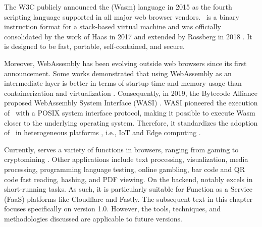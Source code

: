 \msection{\Wasm}
\label{sota:wasm}

The W3C publicly announced the \Wasm(Wasm) language in 2015 as the fourth scripting language supported in all major web browser vendors.
\Wasm\ is a binary instruction format for a stack-based virtual machine and was officially consolidated by the work of Haas \etal \cite{Haas_2017} in 2017 and extended by Rossberg \etal in 2018 \cite{10.1145/3282510}. 
It is designed to be fast, portable, self-contained, and secure.


Moreover, WebAssembly has been evolving outside web browsers since its first announcement.
Some works demonstrated that using WebAssembly as an intermediate layer is better in terms of startup time and memory usage than containerization and virtualization \cite{pMendkiServerless, 1244493Jacobsson}. 
Consequently, in 2019, the Bytecode Alliance proposed WebAssembly System Interface (WASI) \cite{WASI}. 
WASI pioneered the execution of \Wasm\ with a POSIX system interface protocol, making it possible to execute Wasm closer to the underlying operating system. 
Therefore, it standardizes the adoption of \Wasm\ in heterogeneous platforms \cite{bryant2020webassembly}, i.e., IoT and Edge computing \cite{9640153, wen2020wasmachine}.

Currently, \Wasm serves a variety of functions in browsers, ranging from gaming to cryptomining \cite{Hilbig2021AnES}. 
Other applications include text processing, visualization, media processing, programming language testing, online gambling, bar code and QR code fast reading, hashing, and PDF viewing. 
On the backend, \Wasm notably excels in short-running tasks. 
As such, it is particularly suitable for Function as a Service (FaaS) platforms like Cloudflare and Fastly.
The subsequent text in this chapter focuses specifically on \Wasm version 1.0. 
However, the tools, techniques, and methodologies discussed are applicable to future \Wasm versions.





